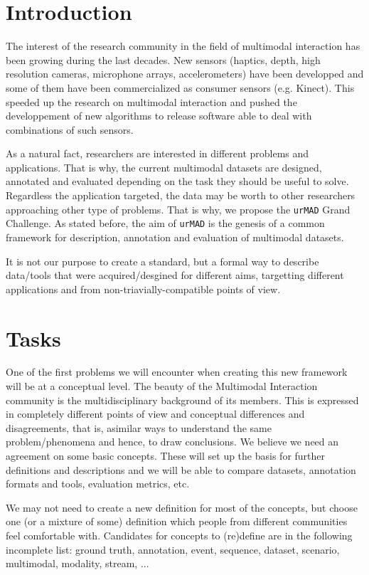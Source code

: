 \documentclass{article}
\begin{document}
 \section{Introduction}
 The interest of the research community in the field of multimodal interaction has been growing during the last decades.
New sensors (haptics, depth, high resolution cameras, microphone arrays, accelerometers) have been developped and some
of them have been commercialized as consumer sensors (e.g. Kinect). This speeded up the research on multimodal
interaction and pushed the developpement of new algorithms to release software able to deal with combinations of such
sensors.

As a natural fact, researchers are interested in different problems and applications. That is why, the current
multimodal datasets are designed, annotated and evaluated depending on the task they should be useful to solve.
Regardless the application targeted, the data may be worth to other researchers approaching other type of problems.
That is why, we propose the \texttt{urMAD} Grand Challenge. As stated before, the aim of \texttt{urMAD} is the genesis
of a common framework for description, annotation and evaluation of multimodal datasets.

It is not our purpose to create a standard, but a formal way to describe data/tools that were acquired/desgined for
different aims, targetting different applications and from non-triavially-compatible points of view.

 \section{Tasks}

One of the first problems we will encounter when creating this new framework will be at a conceptual level. The beauty
of the Multimodal Interaction community is the multidisciplinary background of its members. This is expressed in
completely different points of view and conceptual differences and disagreements, that is, asimilar ways to understand
the same problem/phenomena and hence, to draw conclusions. We believe we need an agreement on some basic concepts. These
will set up the basis for further definitions and descriptions and we will be able to compare datasets, annotation
formats and tools, evaluation metrics, etc.

We may not need to create a new definition for most of the concepts, but choose one (or a mixture of some)
definition which people from different communities feel comfortable with. Candidates for concepts to (re)define are in
the following incomplete list: ground truth, annotation, event, sequence, dataset, scenario, multimodal, modality,
stream, ...
\end{document}
